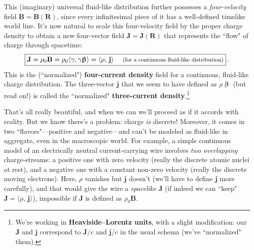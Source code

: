 \documentclass[12pt]{article}
\renewcommand{\vv}[1]{\mathbf{#1}}
\newcommand{\vvbeta}{\bm{\upbeta}}
\begin{document}
This (imaginary) universal fluid-like distribution further possesses a \emph{four-velocity} field $\vv B = \vv B (\vv R)$, since every infinitesimal piece of it has a well-defined timelike world line. It's now natural to scale this four-velocity field by the proper charge density to obtain a new four-vector field $\vv J = \vv J (\vv R)$ that represents the ``flow" of charge through spacetime:
\begin{equation}\label{eq:fcc}
\boxed{\vv J = \rho_0 \vv B = \rho_0 \langle \gamma , \gamma \vvbeta \rangle = \langle \rho, \, \vv j \rangle \quad \text{\footnotesize{ (for a continuous fluid-like distribution)}} } \, .
\end{equation}
This is the (``normalized") \textbf{four-current density} field for a continuous, fluid-like charge distribution. The three-vector $\vv j$ that we seem to have defined as $\rho \vvbeta$ (but read on!) is called the ``normalized" \textbf{three-current density}.\footnote{We're working in \textbf{Heaviside--Lorentz units}, with a slight modification: our $\vv J$ and $\vv j$ correspond to $\vv J / c$ and $\vv j / c$ in the usual schema (we've ``normalized" them).}

That's all really beautiful, and when we can we'll proceed as if it accords with reality. But we know there's a problem: charge \emph{is} discrete! Moreover, it comes in two ``flavors"---positive and negative---and can't be modeled as fluid-like in aggregate, even in the macroscopic world. For example, a simple continuous model of an electrically neutral current-carrying wire involves \emph{two overlapping} charge-streams: a positive one with zero velocity (really the discrete atomic nuclei at rest), and a negative one with a constant non-zero velocity (really the discrete moving electrons). Here, $\rho$ vanishes but $\vv j$ doesn't (we'll have to define $\vv j$ more carefully), and that would give the wire a \emph{spacelike} $\vv J$ (if indeed we can ``keep" $\vv J = \langle \rho, \, \vv j \rangle$), impossible if $\vv J$ is defined as $\rho_0 \vv B$.
\end{document}
